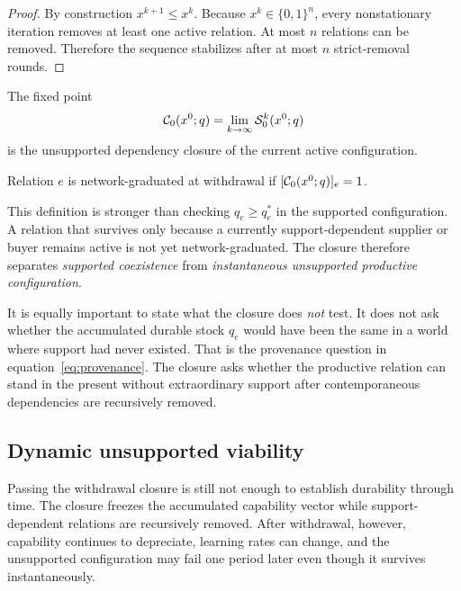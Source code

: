 \begin{proof}
By construction $x^{k+1}\le x^k$. Because $x^k\in\{0,1\}^n$, every nonstationary iteration removes at least one active relation. At most $n$ relations can be removed. Therefore the sequence stabilizes after at most $n$ strict-removal rounds.
\end{proof}

\begin{definition}
The fixed point
\begin{equation}
\mathcal{C}_0(x^0;q)
=
\lim_{k\to\infty}\mathcal S_0^k(x^0;q)
\label{eq:closure}
\end{equation}
is the unsupported dependency closure of the current active configuration.
\end{definition}

\begin{definition}
Relation $e$ is network-graduated at withdrawal if $[\mathcal{C}_0(x^0;q)]_e=1$.
\end{definition}

This definition is stronger than checking $q_e\ge q_e^*$ in the supported configuration. A relation that survives only because a currently support-dependent supplier or buyer remains active is not yet network-graduated. The closure therefore separates \emph{supported coexistence} from \emph{instantaneous unsupported productive configuration}.

It is equally important to state what the closure does \emph{not} test. It does not ask whether the accumulated durable stock $q_e$ would have been the same in a world where support had never existed. That is the provenance question in equation~\eqref{eq:provenance}. The closure asks whether the productive relation can stand in the present without extraordinary support after contemporaneous dependencies are recursively removed.

\subsection{Dynamic unsupported viability}
\label{subsec:dynamic-viability}

Passing the withdrawal closure is still not enough to establish durability through time. The closure freezes the accumulated capability vector while support-dependent relations are recursively removed. After withdrawal, however, capability continues to depreciate, learning rates can change, and the unsupported configuration may fail one period later even though it survives instantaneously.

